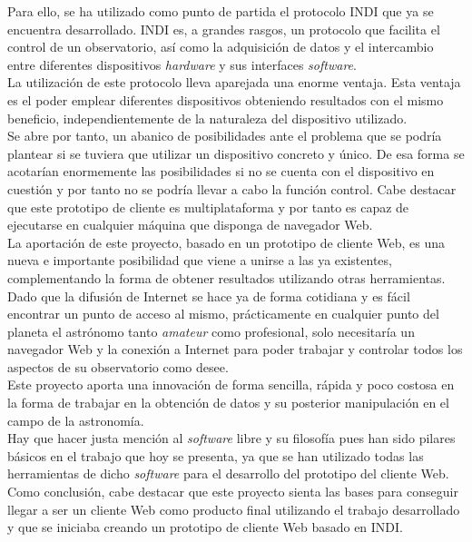 Para ello, se ha utilizado como punto de partida el protocolo INDI que ya se encuentra desarrollado. INDI es, a grandes rasgos, un protocolo que facilita el control de un observatorio, así como la adquisición de datos y el intercambio entre diferentes dispositivos \textit{hardware} y sus interfaces \textit{software}.\\

La utilización de este protocolo lleva aparejada una enorme ventaja. Esta ventaja es el poder emplear diferentes dispositivos obteniendo resultados con el mismo beneficio, independientemente de la naturaleza del dispositivo utilizado.\\
Se abre por tanto, un abanico de posibilidades ante el problema que se podría plantear si se tuviera que utilizar un dispositivo concreto y único. De esa forma se acotarían enormemente las posibilidades si no se cuenta con el dispositivo en cuestión y por tanto no se podría llevar a cabo la función control. Cabe destacar que este prototipo de cliente es multiplataforma y por tanto es capaz de ejecutarse en cualquier máquina que disponga de navegador Web.\\

La aportación de este proyecto, basado en un prototipo de cliente Web, es una nueva e importante posibilidad  que viene a unirse a las ya existentes, complementando la forma de obtener resultados utilizando otras herramientas. \\

Dado que la difusión de Internet se hace ya de forma cotidiana y es fácil encontrar un punto de acceso al mismo, prácticamente en cualquier punto del planeta el astrónomo tanto \textit{amateur} como  profesional, solo necesitaría un navegador Web y la conexión a Internet para poder trabajar y controlar todos los aspectos de su observatorio como desee.\\

Este proyecto aporta una innovación de forma sencilla, rápida y poco costosa en la forma de trabajar en la obtención de datos y su posterior manipulación en el campo de la astronomía.\\

Hay que hacer justa mención al \textit{software} libre y su filosofía pues han sido pilares básicos en el trabajo que hoy se presenta, ya que se han utilizado todas las herramientas de dicho \textit{software} para el desarrollo del prototipo del cliente Web.\\

Como conclusión, cabe destacar que este proyecto sienta las bases para conseguir llegar a ser un cliente Web como producto final utilizando el trabajo desarrollado y que se iniciaba creando un prototipo de cliente Web basado en INDI. \\


